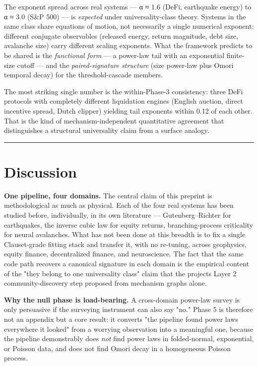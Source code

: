 \documentclass[
  11pt]{article}
\begin{document}
The exponent spread across real systems --- α ≈ 1.6 (DeFi, earthquake
energy) to α ≈ 3.0 (S\&P 500) --- is \emph{expected} under
universality-class theory. Systems in the same class share equations of
motion, not necessarily a single numerical exponent: different conjugate
observables (released energy, return magnitude, debt size, avalanche
size) carry different scaling exponents. What the framework predicts to
be shared is the \emph{functional form} --- a power-law tail with an
exponential finite-size cutoff --- and the \emph{paired-signature
structure} (size power-law plus Omori temporal decay) for the
threshold-cascade members.

The most striking single number is the within-Phase-3 consistency: three
DeFi protocols with completely different liquidation engines (English
auction, direct incentive spread, Dutch clipper) yielding tail exponents
within 0.12 of each other. That is the kind of mechanism-independent
quantitative agreement that distinguishes a structural universality
claim from a surface analogy.

\begin{center}\rule{0.5\linewidth}{0.5pt}\end{center}

\section{Discussion}\label{sec:5}

\textbf{One pipeline, four domains.} The central claim of this preprint
is methodological as much as physical. Each of the four real systems has
been studied before, individually, in its own literature ---
Gutenberg--Richter for earthquakes, the inverse cubic law for equity
returns, branching-process criticality for neural avalanches. What has
not been done at this breadth is to fix a single Clauset-grade fitting
stack and transfer it, with no re-tuning, across geophysics, equity
finance, decentralized finance, and neuroscience. The fact that the same
code path recovers a canonical signature in each domain is the empirical
content of the "they belong to one universality class" claim that the
project\textquotesingle s Layer 2 community-discovery step proposed from
mechanism graphs alone.

\textbf{Why the null phase is load-bearing.} A cross-domain power-law
survey is only persuasive if the surveying instrument can also say "no."
Phase 5 is therefore not an appendix but a core result: it converts "the
pipeline found power laws everywhere it looked" from a worrying
observation into a meaningful one, because the pipeline demonstrably
does \emph{not} find power laws in folded-normal, exponential, or
Poisson data, and does not find Omori decay in a homogeneous Poisson
process.
\end{document}

